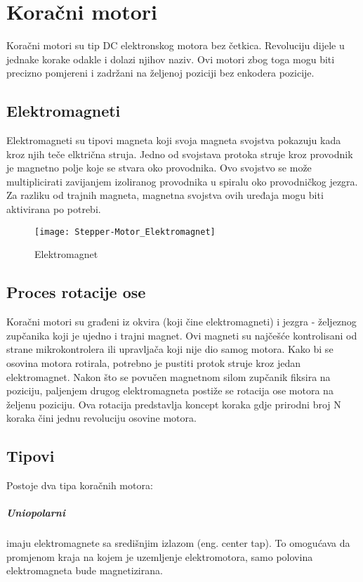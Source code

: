 \documentclass[../Document.tex]{subfiles}
\begin{document}
\section{Koračni motori}
Koračni motori su tip DC elektronskog motora bez četkica. Revoluciju dijele u jednake korake odakle i dolazi njihov naziv. Ovi motori zbog toga mogu biti precizno pomjereni i zadržani na željenoj poziciji bez enkodera pozicije.
\vspace{0.5cm}
\subsection{Elektromagneti}
Elektromagneti su tipovi magneta koji svoja magneta svojstva pokazuju kada kroz njih teče elktrična struja. Jedno od svojstava protoka struje kroz provodnik je magnetno polje koje se stvara oko provodnika. Ovo svojstvo se može multiplicirati zavijanjem izoliranog provodnika u spiralu oko provodničkog jezgra. Za razliku od trajnih magneta, magnetna svojstva ovih uređaja mogu biti aktivirana po potrebi.\\

\begin{figure}[h]
    \centering
    \hspace{1.8cm}
    \texttt{[image: Stepper-Motor\_Elektromagnet]}
    \caption{Elektromagnet}
\end{figure}

\subsection{Proces rotacije ose}
Koračni motori su građeni iz okvira (koji čine elektromagneti) i jezgra - željeznog zupčanika koji je ujedno i trajni magnet. Ovi magneti su najčešće kontrolisani od strane mikrokontrolera ili upravljača koji nije dio samog motora. Kako bi se osovina motora rotirala, potrebno je pustiti protok struje kroz jedan elektromagnet. Nakon što se povučen magnetnom silom zupčanik fiksira na poziciju, paljenjem drugog elektromagneta postiže se rotacija ose motora na željenu poziciju. Ova rotacija predstavlja koncept koraka gdje prirodni broj N koraka čini jednu revoluciju osovine motora.

\subsection{Tipovi}
Postoje dva tipa koračnih motora:

\subparagraph{Uniopolarni} \noindent imaju elektromagnete sa središnjim izlazom (eng. center tap). To omogućava da promjenom kraja na kojem je uzemljenje elektromotora, samo polovina elektromagneta bude magnetizirana.\\
\end{document}
